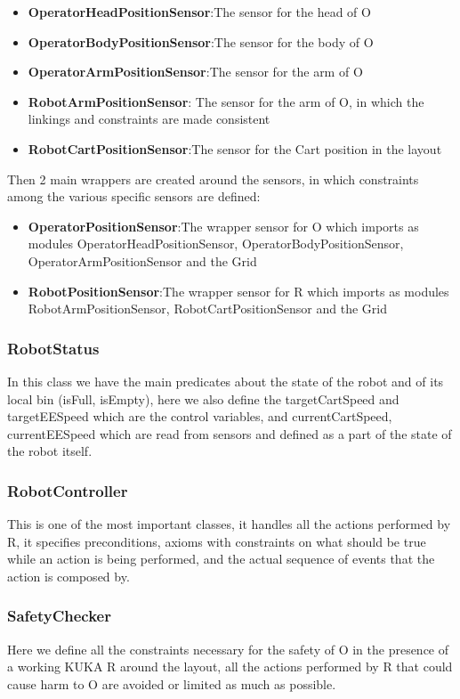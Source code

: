 \documentclass[a4paper]{article}
\begin{document}
\begin{itemize}
    \item \textbf{OperatorHeadPositionSensor}:\@ The sensor for the head of O
    \item \textbf{OperatorBodyPositionSensor}:\@ The sensor for the body of O
    \item \textbf{OperatorArmPositionSensor}:\@ The sensor for the arm of O
    \item \textbf{RobotArmPositionSensor}:\@
The sensor for the arm of O, in which the linkings and constraints are made consistent
    \item \textbf{RobotCartPositionSensor}:\@ The sensor for the Cart position in the layout
\end{itemize}

Then 2 main wrappers are created around the sensors, in which constraints among the various specific sensors are defined:
\begin{itemize}
    \item \textbf{OperatorPositionSensor}:\@ The wrapper sensor for O which imports as modules OperatorHeadPositionSensor, OperatorBodyPositionSensor, OperatorArmPositionSensor and the Grid
    \item \textbf{RobotPositionSensor}:\@ The wrapper sensor for R which imports as modules RobotArmPositionSensor, RobotCartPositionSensor and the Grid

\end{itemize}

\subsubsection{RobotStatus}
In this class we have the main predicates about the state of the robot and of its local bin (isFull, isEmpty), here we also define the targetCartSpeed and targetEESpeed which are the control variables, and currentCartSpeed, currentEESpeed which are read from sensors and defined as a part of the state of the robot itself.

\subsubsection{RobotController}
This is one of the most important classes, it handles all the actions performed by R, it specifies preconditions, axioms with constraints on what should be true while an action is being performed, and the actual sequence of events that the action is composed by.

\subsubsection{SafetyChecker}
Here we define all the constraints necessary for the safety of O in the presence of a working KUKA R around the layout, all the actions performed by R that could cause harm to O are avoided or limited as much as possible.
\end{document}
